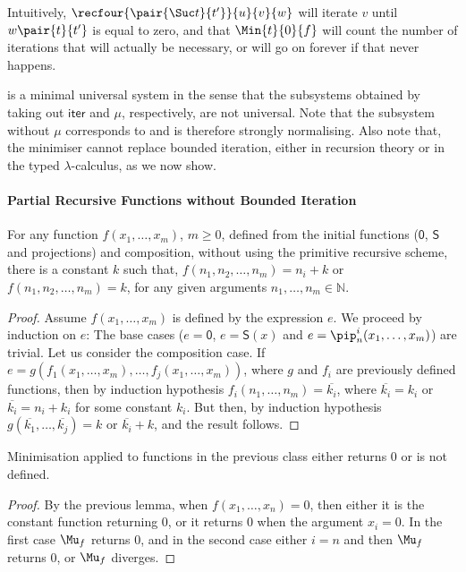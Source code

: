 \documentclass{article}
\begin{document}
Intuitively, $\recfour{\pair{\Suc t}{t'}}{u}{v}{w}$ will iterate $v$
until $w\pair{t}{t'}$ is equal to zero, and that $\Min{t}{0}{f}$ will
count the number of iterations that will actually be necessary, or
will go on forever if that never happens.

\LLCIm is a minimal universal system in the sense that the subsystems obtained by taking out $\mathsf{iter}$ and $\mu$, respectively, are not universal. Note that the subsystem without $\mu$ corresponds to \LLCI and is therefore strongly normalising.
Also note that, the minimiser cannot replace bounded iteration, either in recursion theory or in the typed $\lambda$-calculus, as we now show.
\paragraph{Partial Recursive Functions without Bounded Iteration}
\begin{lemma}
For any function $f(x_1,\dots, x_m)$, $m\geq 0$, defined from the initial
functions ($\textsf{0}$, $\textsf{S}$ and projections) and composition,
without using the primitive recursive scheme, there is a constant $k$ such that, 
 $f(n_1,n_2,\dots,n_m) = n_i + k$ or
$f(n_1,n_2,\dots,n_m) = k$, for any given arguments $n_1,\dots,n_m \in \mathbb{N}$.
\end{lemma}

\begin{proof}
Assume $f(x_1,\dots,x_m)$ is defined by the expression $e$.
We proceed by induction on $e$: The base cases ($e = \textsf{0}$, $e = \textsf{S}(x)$ and $e = \pip_n^i(x_1,\dots,x_m)$) are trivial. Let us consider the composition case.
If $e = g(f_1(x_1,\dots,x_m),\dots,f_j(x_1,\dots,x_m))$, where $g$ and $f_i$ are previously defined functions, then 
by induction hypothesis $f_i(n_1,\dots,n_m) = \overline{k_i}$, where $ \overline{k_i} = k_i$ or $\overline{k_i} = n_i + k_i$ for some constant $k_i$. But then, by induction hypothesis $g(\overline{k_1},\dots,\overline{k_j}) = k$ or $\overline{k_i} + k$, and the result follows.
\end{proof}

\begin{theorem}
Minimisation applied to functions in the previous class either returns 0 or is not defined.
\end{theorem}

\begin{proof}
By the previous lemma, when $f(x_1,\dots,x_n) = 0$, then either it is
the constant function returning $0$, or it returns $0$ when the
argument $x_i = 0$. In the first case $\Mu_f$ returns $0$, 
and in the second case either $i=n$ and then $\Mu_f$ returns $0$, or $\Mu_f$
diverges.
\end{proof}
\end{document}
